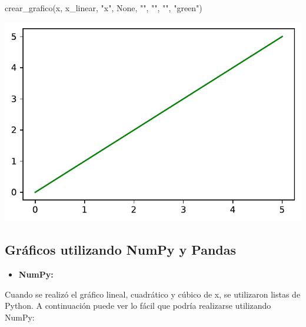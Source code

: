 \documentclass[
  letterpaper,
  DIV=11,
  numbers=noendperiod]{scrreprt}
\newenvironment{Shaded}{\begin{snugshade}}{\end{snugshade}}
\newcommand{\NormalTok}[1]{\textcolor[rgb]{0.00,0.23,0.31}{#1}}
\newcommand{\StringTok}[1]{\textcolor[rgb]{0.13,0.47,0.30}{#1}}
\newcommand{\VariableTok}[1]{\textcolor[rgb]{0.07,0.07,0.07}{#1}}
\providecommand{\tightlist}{%
  \setlength{\itemsep}{0pt}\setlength{\parskip}{0pt}}\usepackage{longtable,booktabs,array}
\begin{document}
\begin{Shaded}
\begin{Highlighting}[]
\NormalTok{crear\_grafico(x, x\_linear, }\StringTok{"x"}\NormalTok{, }\VariableTok{None}\NormalTok{, }\StringTok{""}\NormalTok{, }\StringTok{""}\NormalTok{, }\StringTok{""}\NormalTok{, }\StringTok{"green"}\NormalTok{)}
\end{Highlighting}
\end{Shaded}

\includegraphics{unidad_6_files/figure-pdf/cell-129-output-1.pdf}

\subsection{Gráficos utilizando NumPy y
Pandas}\label{gruxe1ficos-utilizando-numpy-y-pandas}

\begin{itemize}
\tightlist
\item
  \textbf{NumPy:}
\end{itemize}

Cuando se realizó el gráfico lineal, cuadrático y cúbico de x, se
utilizaron listas de Python. A continuación puede ver lo fácil que
podría realizarse utilizando NumPy:
\end{document}

